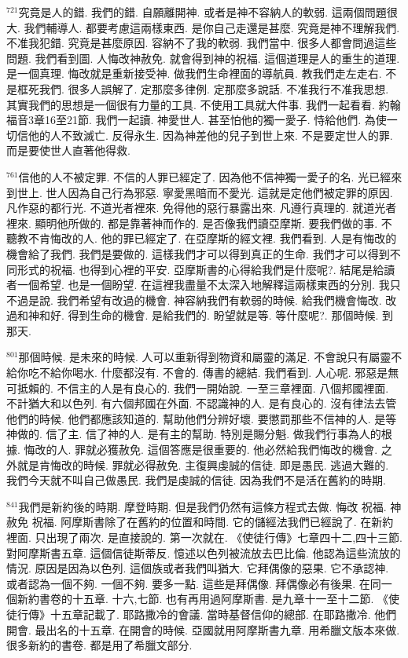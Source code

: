 \documentclass{book}
\begin{document}
$^{721}$究竟是人的錯.
我們的錯.
自願離開神.
或者是神不容納人的軟弱.
這兩個問題很大.
我們輔導人.
都要考慮這兩樣東西.
是你自己走還是甚麼.
究竟是神不理解我們.
不准我犯錯.
究竟是甚麼原因.
容納不了我的軟弱.
我們當中.
很多人都會問過這些問題.
我們看到圖.
人悔改神赦免.
就會得到神的祝福.
這個道理是人的重生的道理.
是一個真理.
悔改就是重新接受神.
做我們生命裡面的導航員.
教我們走左走右.
不是框死我們.
很多人誤解了.
定那麼多律例.
定那麼多說話.
不准我行不准我思想.
其實我們的思想是一個很有力量的工具.
不使用工具就大件事.
我們一起看看.
約翰福音3章16至21節.
我們一起讀.
神愛世人.
甚至怕他的獨一愛子.
恃給他們.
為使一切信他的人不致滅亡.
反得永生.
因為神差他的兒子到世上來.
不是要定世人的罪.
而是要使世人直著他得救.

$^{761}$信他的人不被定罪.
不信的人罪已經定了.
因為他不信神獨一愛子的名.
光已經來到世上.
世人因為自己行為邪惡.
寧愛黑暗而不愛光.
這就是定他們被定罪的原因.
凡作惡的都行光.
不道光者裡來.
免得他的惡行暴露出來.
凡遵行真理的.
就道光者裡來.
顯明他所做的.
都是靠著神而作的.
是否像我們讀亞摩斯.
要我們做的事.
不聽教不肯悔改的人.
他的罪已經定了.
在亞摩斯的經文裡.
我們看到.
人是有悔改的機會給了我們.
我們是要做的.
這樣我們才可以得到真正的生命.
我們才可以得到不同形式的祝福.
也得到心裡的平安.
亞摩斯書的心得給我們是什麼呢?.
結尾是給讀者一個希望.
也是一個盼望.
在這裡我盡量不太深入地解釋這兩樣東西的分別.
我只不過是說.
我們希望有改過的機會.
神容納我們有軟弱的時候.
給我們機會悔改.
改過和神和好.
得到生命的機會.
是給我們的.
盼望就是等.
等什麼呢?.
那個時候.
到那天.

$^{801}$那個時候.
是未來的時候.
人可以重新得到物資和屬靈的滿足.
不會說只有屬靈不給你吃不給你喝水.
什麼都沒有.
不會的.
傳書的總結.
我們看到.
人心呢.
邪惡是無可抵賴的.
不信主的人是有良心的.
我們一開始說.
一至三章裡面.
八個邦國裡面.
不計猶大和以色列.
有六個邦國在外面.
不認識神的人.
是有良心的.
沒有律法去管他們的時候.
他們都應該知道的.
幫助他們分辨好壞.
要懲罰那些不信神的人.
是等神做的.
信了主.
信了神的人.
是有主的幫助.
特別是賜分魁.
做我們行事為人的根據.
悔改的人.
罪就必獲赦免.
這個答應是很重要的.
他必然給我們悔改的機會.
之外就是肯悔改的時候.
罪就必得赦免.
主復興虔誠的信徒.
即是愚民.
逃過大難的.
我們今天就不叫自己做愚民.
我們是虔誠的信徒.
因為我們不是活在舊約的時期.

$^{841}$我們是新約後的時期.
摩登時期.
但是我們仍然有這條方程式去做.
悔改 祝福.
神赦免 祝福.
阿摩斯書除了在舊約的位置和時間.
它的儲經法我們已經說了.
在新約裡面.
只出現了兩次.
是直接說的.
第一次就在.
《使徒行傳》七章四十二,四十三節.
對阿摩斯書五章.
這個信徒斯蒂反.
憶述以色列被流放去巴比倫.
他認為這些流放的情況.
原因是因為以色列.
這個族或者我們叫猶大.
它拜偶像的惡果.
它不承認神.
或者認為一個不夠.
一個不夠.
要多一點.
這些是拜偶像.
拜偶像必有後果.
在同一個新約書卷的十五章.
十六,七節.
也有再用過阿摩斯書.
是九章十一至十二節.
《使徒行傳》十五章記載了.
耶路撒冷的會議.
當時基督信仰的總部.
在耶路撒冷.
他們開會.
最出名的十五章.
在開會的時候.
亞國就用阿摩斯書九章.
用希臘文版本來做.
很多新約的書卷.
都是用了希臘文部分.
\end{document}
